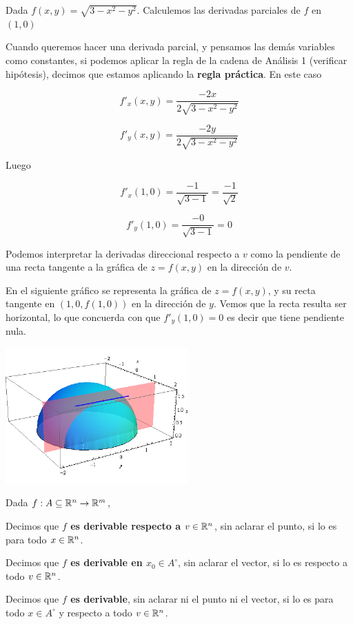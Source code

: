 \begin{example}
Dada $f(x,y) = \sqrt{3 - x^2 - y^2} $.  Calculemos las derivadas parciales de $f$ en $(1,0)$

Cuando queremos hacer una derivada parcial, y pensamos las demás variables como constantes, si podemos aplicar la regla de la cadena de Análisis 1 (verificar hipótesis), decimos que estamos aplicando la \textbf{regla práctica}.  En este caso

$$ f'_x(x,y) = \frac{ -2x }{2 \sqrt{3 - x^2 - y^2}} $$

$$ f'_y(x,y) = \frac{-2y }{2 \sqrt{3 - x^2 - y^2}} $$

Luego

$$ f'_x(1,0) = \frac{- 1 }{ \sqrt{3 - 1}} = \frac{-1}{\sqrt{2}} $$

$$ f'_y(1,0) = \frac{- 0 }{ \sqrt{3 - 1}} = 0 $$

Podemos interpretar la derivadas direccional respecto a $v$ como la pendiente de una recta tangente a la gráfica de $z = f(x,y)$ en la dirección de $v$.  

En el siguiente gráfico se representa la gráfica de $z = f(x,y)$, y su recta tangente en $(1,0,f(1,0))$ en la dirección de $y$.  Vemos que la recta resulta ser horizontal, lo que concuerda con que $f'_y(1,0) = 0$ es decir que tiene pendiente nula.

\begin{center}
\includegraphics[width=7cm]{images/04_analisis2/tp4_ej5.png}
\end{center}
\end{example}


\begin{definition}
Dada $f : A \subseteq \mathbb{R}^n \to \mathbb{R}^m$, 

Decimos que \textbf{$f$ es derivable respecto a $v \in \mathbb{R}^n$}, sin aclarar el punto, si lo es para todo $x \in \mathbb{R}^n$.

Decimos que \textbf{$f$ es derivable en $x_0 \in A^{\circ}$}, sin aclarar el vector, si lo es respecto a todo $v \in \mathbb{R}^n$.

Decimos que \textbf{$f$ es derivable}, sin aclarar ni el punto ni el vector, si lo es para todo $x \in A^{\circ}$ y respecto a todo $v \in \mathbb{R}^n$.
\end{definition}

